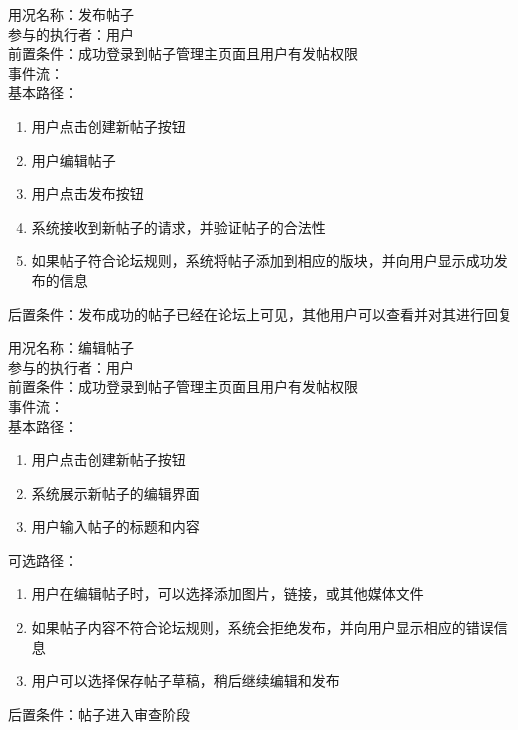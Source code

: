 \begin{framed}
\noindent
用况名称：发布帖子\\
参与的执行者：用户\\
前置条件：成功登录到帖子管理主页面且用户有发帖权限\\
事件流：\\
基本路径：
\begin{enumerate}[itemsep=2pt,topsep=0pt,parsep=0pt,itemindent=1em]
    \item 用户点击创建新帖子按钮
    \item 用户编辑帖子
    \item 用户点击发布按钮
    \item 系统接收到新帖子的请求，并验证帖子的合法性
    \item 如果帖子符合论坛规则，系统将帖子添加到相应的版块，并向用户显示成功发布的信息
\end{enumerate}
\noindent
后置条件：发布成功的帖子已经在论坛上可见，其他用户可以查看并对其进行回复
\end{framed}

\begin{framed}
\noindent
用况名称：编辑帖子\\
参与的执行者：用户\\
前置条件：成功登录到帖子管理主页面且用户有发帖权限\\
事件流：\\
基本路径：
\begin{enumerate}[itemsep=2pt,topsep=0pt,parsep=0pt,itemindent=1em]
    \item 用户点击创建新帖子按钮
    \item 系统展示新帖子的编辑界面
    \item 用户输入帖子的标题和内容
\end{enumerate}
\noindent
可选路径：\par
   \begin{enumerate}[itemsep=2pt,topsep=0pt,parsep=0pt,itemindent=1em]  
       \item 用户在编辑帖子时，可以选择添加图片，链接，或其他媒体文件 
       \item 如果帖子内容不符合论坛规则，系统会拒绝发布，并向用户显示相应的错误信息
       \item 用户可以选择保存帖子草稿，稍后继续编辑和发布 
   \end{enumerate} 
后置条件：帖子进入审查阶段
\end{framed}

